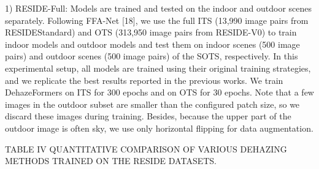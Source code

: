 1) RESIDE-Full: Models are trained and tested on the indoor and outdoor scenes separately. Following FFA-Net [18], we use the full ITS (13,990 image pairs from RESIDEStandard) and OTS (313,950 image pairs from RESIDE-V0) to train indoor models and outdoor models and test them on indoor scenes (500 image pairs) and outdoor scenes (500 image pairs) of the SOTS, respectively. In this experimental setup, all models are trained using their original training strategies, and we replicate the best results reported in the previous works. We train DehazeFormers on ITS for 300 epochs and on OTS for 30 epochs. Note that a few images in the outdoor subset are smaller than the configured patch size, so we discard these images during training. Besides, because the upper part of the outdoor image is often sky, we use only horizontal flipping for data augmentation.

TABLE IV QUANTITATIVE COMPARISON OF VARIOUS DEHAZING METHODS TRAINED ON THE RESIDE DATASETS.


